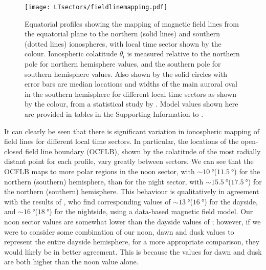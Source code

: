 \begin{figure}
\centering
\texttt{[image: LTsectors/fieldlinemapping.pdf]}
\caption[Model equatorial profiles of field line mappings from the equator to the ionosphere, for different local time sectors, for the compressed and expanded regimes.]{Equatorial profiles showing the mapping of magnetic field lines from the equatorial plane to the northern (solid lines) and southern (dotted lines) ionospheres, with local time sector shown by the colour. Ionospheric colatitude $\theta_\mathrm{i}$ is measured relative to the northern pole for northern hemisphere values, and the southern pole for southern hemisphere values. Also shown by the solid circles with error bars are median locations and widths of the main auroral oval in the southern hemisphere for different local time sectors as shown by the colour, from a statistical study by \citet{badman2006}. Model values shown here are provided in tables in the Supporting Information to \citet{sorba2019}.}
\label{LTsectors:fig:fieldlinemapping}
\end{figure}

It can clearly be seen that there is significant variation in ionospheric mapping of field lines for different local time sectors. In particular, the locations of the open-closed field line boundary (OCFLB), shown by the colatitude of the most radially distant point for each profile, vary greatly between sectors. We can see that the OCFLB maps to more polar regions in the noon sector, with ${\sim}\SI{10}{\degree}$($\SI{11.5}{\degree}$) for the northern (southern) hemisphere, than for the night sector, with ${\sim}\SI{15.5}{\degree}$($\SI{17.5}{\degree}$) for the northern (southern) hemisphere. This behaviour is qualitatively in agreement with the results of \citet{carbary2018}, who find corresponding values of ${\sim}\SI{13}{\degree}$($\SI{16}{\degree}$) for the dayside, and ${\sim}\SI{16}{\degree}$($\SI{18}{\degree}$) for the nightside, using a data-based magnetic field model. Our noon sector values are somewhat lower than the dayside values of \citet{carbary2018}; however, if we were to consider some combination of our noon, dawn and dusk values to represent the entire dayside hemisphere, for a more appropriate comparison, they would likely be in better agreement. This is because the values for dawn and dusk are both higher than the noon value alone.

